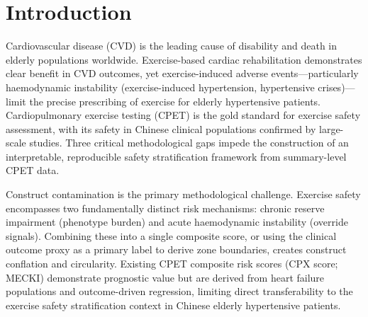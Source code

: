 \documentclass[12pt, a4paper]{article}
\begin{document}
\begin{abstract}
\textbf{Conclusions:}
This study establishes a summary-level CPET safety stratification framework
that strictly separates chronic reserve impairment from acute instability signals
and replaces forced classification with explicit uncertainty quantification,
providing a reproducible CPET safety assessment methodology for Chinese
elderly hypertensive patients and a target population screening entry-point
for subsequent breath-by-breath waveform-level research.

\textbf{Keywords:} cardiopulmonary exercise testing; phenotype burden score;
exercise safety stratification; instability override; confidence quantification;
uncertainty output; conditional quantile reference; Chinese hypertension
\end{abstract}

\section{Introduction}

Cardiovascular disease (CVD) is the leading cause of disability and death in
elderly populations worldwide\cite{WHO2023}. Exercise-based cardiac rehabilitation
demonstrates clear benefit in CVD outcomes\cite{Piepoli2016,Thomas2019}, yet
exercise-induced adverse events---particularly haemodynamic instability
(exercise-induced hypertension, hypertensive crises)---limit the precise
prescribing of exercise for elderly hypertensive patients\cite{Myers2013}.
Cardiopulmonary exercise testing (CPET) is the gold standard for exercise safety
assessment\cite{Balady2010,Guazzi2012}, with its safety in Chinese clinical
populations confirmed by large-scale studies\cite{Xiangya2021,SunXG2022consensus}.
Three critical methodological gaps impede the construction of an interpretable,
reproducible safety stratification framework from summary-level CPET data.

Construct contamination is the primary methodological challenge.
Exercise safety encompasses two fundamentally distinct risk mechanisms:
chronic reserve impairment (phenotype burden) and acute haemodynamic instability
(override signals). Combining these into a single composite score, or using the
clinical outcome proxy as a primary label to derive zone boundaries, creates
construct conflation and circularity\cite{Ross2024}.
Existing CPET composite risk scores (CPX score\cite{Gorodeski2008cpx,CPXvalidation2013};
MECKI\cite{MECKI2023}) demonstrate prognostic value but are derived from
heart failure populations and outcome-driven regression, limiting direct
transferability to the exercise safety stratification context in Chinese
elderly hypertensive patients.
\end{document}
